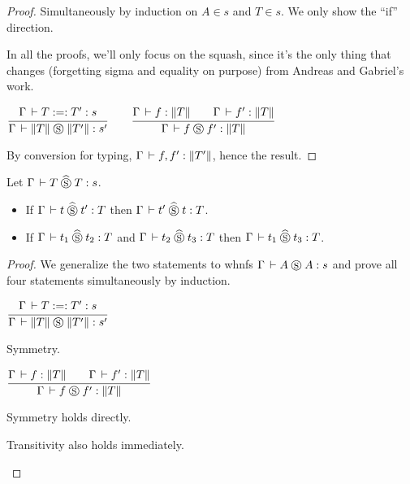 \documentclass[a4paper,english]{lipics-utf8x}
\begin{document}
  \begin{proof}
    Simultaneously by induction on $A \in s$ and $T \in s$.
    We only show the ``if'' direction.

    In all the proofs, we'll only focus on the squash, since it's the only
    thing that changes (forgetting sigma and equality on purpose) from
    Andreas and Gabriel's work.

    \begin{center}
    \(
      \ru{\Gamma \der T :=: T' : s
        }{\Gamma \der \squash{T} \Sr \squash{T'} : s'}
      \qquad
      \ru{\Gamma \der f : \squash{T} \qquad
          \Gamma \der f' : \squash{T}
        }{\Gamma \der f \Sr f' : \squash{T}}
    \)
    \end{center}
    By conversion for typing, $\Gamma \,\vdash f, f' : \|T'\|$, hence the
    result.
  \end{proof}

  \begin{lemma}
    \label{lem:s-per}
    Let $\Gamma \,\vdash T \mathrel{\widehat{\mathrel{\circledS}}} T : s$.
    \leavevmode
    \begin{itemize}
      \item If $\Gamma \,\vdash t \mathrel{\widehat{\mathrel{\circledS}}} t' : T$ then $\Gamma \,\vdash t' \mathrel{\widehat{\mathrel{\circledS}}} t : T$.
      \item If $\Gamma \,\vdash t_1 \mathrel{\widehat{\mathrel{\circledS}}} t_2 : T$ and $\Gamma \,\vdash t_2 \mathrel{\widehat{\mathrel{\circledS}}} t_3 : T$
      then $\Gamma \,\vdash t_1 \mathrel{\widehat{\mathrel{\circledS}}} t_3 : T$.
    \end{itemize}
  \end{lemma}

  \begin{proof}
    We generalize the two statements to whnfs $\Gamma \,\vdash A \mathrel{\circledS} A : s$ and
    prove all four statements simultaneously by induction.

    \begin{center}
    \(
      \ru{\Gamma \der T :=: T' : s
        }{\Gamma \der \squash{T} \Sr \squash{T'} : s'}
    \)
    \end{center}

    \begin{caselist}
      \nextcase Symmetry.
      \begin{center}
      \(
        \ru{\Gamma \der f : \squash{T} \qquad
            \Gamma \der f' : \squash{T}
          }{\Gamma \der f \Sr f' : \squash{T}}
      \)
      \end{center}
      Symmetry holds directly.

      \nextcase Transitivity also holds immediately.
    \end{caselist}
  \end{proof}
\end{document}
